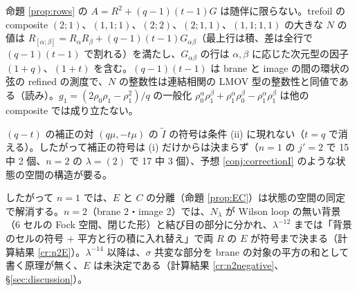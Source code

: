 \begin{compresult}\label{cr:composite}
命題 \ref{prop:rows} の $A = R^2 + (q-1)(t-1)G$ は随伴に限らない。trefoil の composite $(2;1)$、$(1,1;1)$、$(2;2)$、$(2;1,1)$、$(1,1;1,1)$ の大きな $N$ の値は
$R_{[\alpha;\beta]} = R_\alpha R_\beta + (q-1)(t-1)G_{\alpha\beta}$（最上行は積、差は全行で $(q-1)(t-1)$ で割れる）を満たし、$G_{\alpha\beta}$ の行は $\alpha, \beta$ に応じた次元型の因子 $(1+q)$、$(1+t)$ を含む。$(q-1)(t-1)$ は brane と image の間の環状の弦の refined の測度で、$N$ の整数性は連結相関の LMOV 型の整数性と同値である（読み）。$g_1 = (2\rho_0\rho_1 - \rho_1^2)/q$ の一般化 $\rho_0^\alpha\rho_1^\beta + \rho_1^\alpha\rho_0^\beta - \rho_1^\alpha\rho_1^\beta$ は他の composite では成り立たない。
\end{compresult}
\begin{proposition}\label{prop:pairblind}
$(q-t)$ の補正の対 $(q\mu, -t\mu)$ の $\tilde I$ の符号は条件 (ii) に現れない（$t = q$ で消える）。したがって補正の符号は (i) だけからは決まらず（$n = 1$ の $j' = 2$ で 15 中 2 個、$n = 2$ の $\lambda = (2)$ で 17 中 3 個）、予想 \ref{conj:correctionI} のような状態の空間の構造が要る。
\end{proposition}
したがって $n = 1$ では、$E$ と $C$ の分離（命題 \ref{prop:EC}）は状態の空間の同定で解消する。$n = 2$（brane 2・image 2）では、$N_\lambda$ が Wilson loop の無い背景（6 セルの Fock 空間、閉じた形）と結び目の部分に分かれ、$\lambda^{-12}$ までは「背景のセルの符号 $+$ 平方と行の積に入れ替え」で両 $R$ の $E$ が符号まで決まる（計算結果 \ref{cr:n2E}）。$\lambda^{-14}$ 以降は、$\sigma$ 共変な部分を brane の対象の平方の和として書く原理が無く、$E$ は未決定である（計算結果 \ref{cr:n2negative}、\S\ref{sec:discussion}）。

